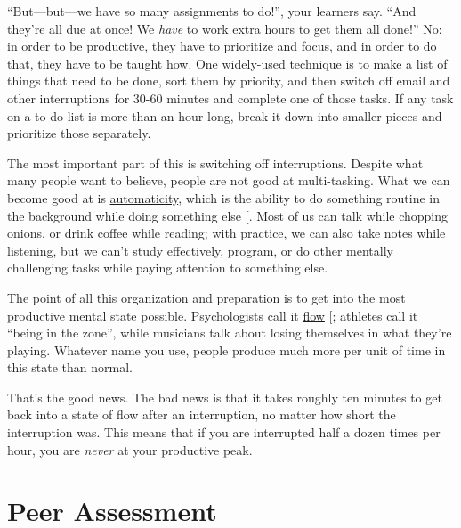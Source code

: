 ``But---but---we have so many assignments to do!'', your learners say. ``And
they're all due at once! We \emph{have} to work extra hours to get them all
done!'' No: in order to be productive, they have to prioritize and
focus, and in order to do that, they have to be taught how. One
widely-used technique is to make a list of things that need to be done,
sort them by priority, and then switch off email and other interruptions
for 30-60 minutes and complete one of those tasks. If any task on a
to-do list is more than an hour long, break it down into smaller pieces
and prioritize those separately.

The most important part of this is switching off
interruptions. Despite what many people want to believe, people are
not good at multi-tasking. What we can become good at is
\protect\hyperlink{g:automaticity}{automaticity}, which is the ability to do something
routine in the background while doing something else
{[}\protect[\hyperlink{b:Mill2016a}{Mill2016a}]{]}. Most of us can talk while chopping onions, or
drink coffee while reading; with practice, we can also take notes
while listening, but we can't study effectively, program, or do other
mentally challenging tasks while paying attention to something else.

The point of all this organization and preparation is to get into the
most productive mental state possible. Psychologists call it
\protect\hyperlink{g:flow}{flow} {[}\protect[\hyperlink{b:Csik2008}{Csik2008}]{]}; athletes call it ``being in the
zone'', while musicians talk about losing themselves in what they're
playing. Whatever name you use, people produce much more per unit of
time in this state than normal.

That's the good news. The bad news is that it takes roughly ten minutes
to get back into a state of flow after an interruption, no matter how
short the interruption was. This means that if you are interrupted half
a dozen times per hour, you are \emph{never} at your productive peak.

\section{Peer Assessment}\label{s:individual-peer}

